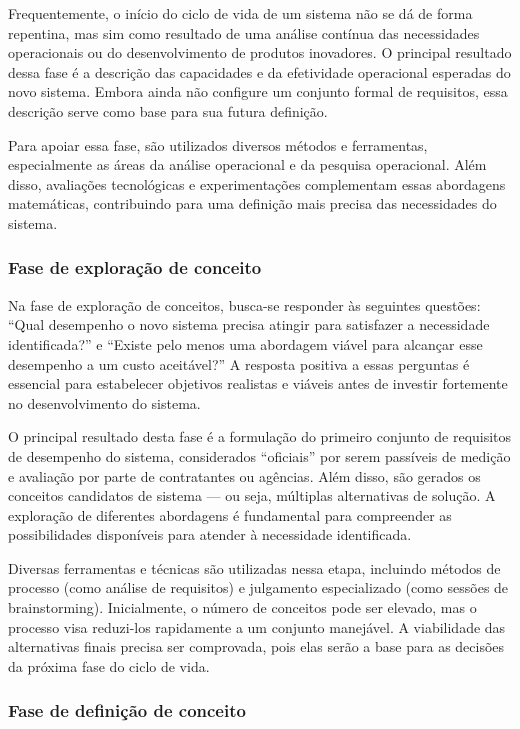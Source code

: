 	Frequentemente, o início do ciclo de vida de um sistema não se dá de forma repentina, mas sim como resultado de uma análise contínua das necessidades 
	operacionais ou do desenvolvimento de produtos inovadores. O principal resultado dessa fase é a descrição das capacidades e da efetividade operacional 
	esperadas do novo sistema. Embora ainda não configure um conjunto formal de requisitos, essa 
	descrição serve como base para sua futura definição.
		
	Para apoiar essa fase, são utilizados diversos métodos e ferramentas, especialmente as áreas da análise operacional e da pesquisa operacional. Além disso, 
	avaliações tecnológicas e experimentações complementam essas abordagens matemáticas, contribuindo para uma definição mais precisa das necessidades do sistema.

	\subsubsection*{Fase de exploração de conceito}

	Na fase de exploração de conceitos, busca-se responder às seguintes questões: “Qual desempenho o novo sistema precisa atingir para satisfazer a necessidade 
	identificada?” e “Existe pelo menos uma abordagem viável para alcançar esse desempenho a um custo aceitável?” A resposta positiva a essas perguntas é essencial 
	para estabelecer objetivos realistas e viáveis antes de investir fortemente no desenvolvimento do sistema.

	O principal resultado desta fase é a formulação do primeiro conjunto de requisitos de desempenho do sistema, considerados “oficiais” por serem passíveis de 
	medição e avaliação por parte de contratantes ou agências. Além disso, são gerados os conceitos candidatos de sistema — ou seja, múltiplas alternativas de 
	solução. A exploração de diferentes abordagens é fundamental para compreender as possibilidades disponíveis para atender à necessidade identificada.

	Diversas ferramentas e técnicas são utilizadas nessa etapa, incluindo métodos de processo (como análise de requisitos) e julgamento especializado 
	(como sessões de brainstorming). Inicialmente, o número de conceitos pode ser elevado, mas o processo visa reduzi-los 
	rapidamente a um conjunto manejável. A viabilidade das alternativas finais precisa ser comprovada, pois elas serão a base para as decisões da próxima fase do 
	ciclo de vida.
	
	\subsubsection*{Fase de definição de conceito}

